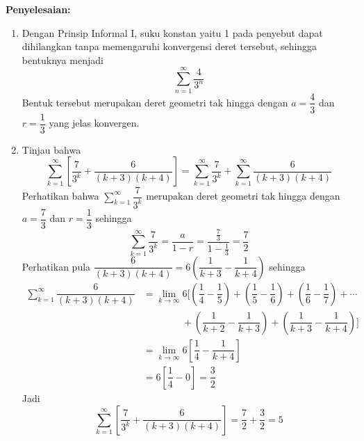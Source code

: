 \documentclass{article}
\begin{document}
\begin{enumerate}
	\textbf{Penyelesaian:}
	\begin{enumerate}
		\item Dengan Prinsip Informal I, suku konstan yaitu 1 pada penyebut dapat dihilangkan tanpa memengaruhi konvergensi deret tersebut, sehingga bentuknya menjadi 
		$$ \sum_{n=1}^\infty \dfrac{4}{3^n} $$
		Bentuk tersebut merupakan deret geometri tak hingga dengan $a=\dfrac{4}{3}$ dan $r=\dfrac{1}{3}$ yang jelas konvergen.
		\item Tinjau bahwa 
		$$ \sum_{k=1}^\infty \left[\dfrac{7}{3^k}+\dfrac{6}{(k+3)(k+4)}\right] = \sum_{k=1}^\infty \dfrac{7}{3^k}+\sum_{k=1}^\infty \dfrac{6}{(k+3)(k+4)}  $$
		Perhatikan bahwa $\displaystyle \sum_{k=1}^\infty \dfrac{7}{3^k} $ merupakan deret geometri tak hingga dengan $a=\dfrac{7}{3}$ dan $r=\dfrac{1}{3}$ sehingga 
		$$ \sum_{k=1}^\infty \dfrac{7}{3^k} = \dfrac{a}{1-r} = \dfrac{\frac{7}{3}}{1-\frac{1}{3}} = \dfrac{7}{2} $$
		Perhatikan pula $\dfrac{6}{(k+3)(k+4)}=6\left(\dfrac{1}{k+3}-\dfrac{1}{k+4}\right)$ sehingga 
		\begin{align*}
		\sum_{k=1}^\infty \dfrac{6}{(k+3)(k+4)} &= \lim_{k\rightarrow \infty} 6\bigg[\left(\dfrac{1}{4}-\dfrac{1}{5}\right)+\left(\dfrac{1}{5}-\dfrac{1}{6}\right)+\left(\dfrac{1}{6}-\dfrac{1}{7}\right)+\cdots \\
		&\qquad \qquad +\left(\dfrac{1}{k+2}-\dfrac{1}{k+3}\right)+\left(\dfrac{1}{k+3}-\dfrac{1}{k+4}\right)\bigg]\\
		&= \lim_{k\rightarrow \infty} 6 \left[\dfrac{1}{4}-\dfrac{1}{k+4}\right]\\
		&= 6\left[\dfrac{1}{4}-0\right]=\dfrac{3}{2}
		\end{align*}
		Jadi 
		$$ \sum_{k=1}^\infty \left[\dfrac{7}{3^k}+\dfrac{6}{(k+3)(k+4)}\right] =\dfrac{7}{2} + \dfrac{3}{2} = 5 $$
	\end{enumerate}
\end{enumerate}
\newpage
\end{document}
